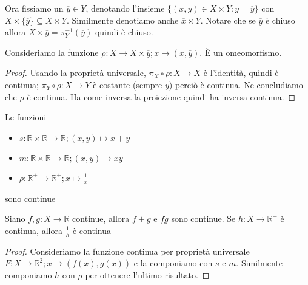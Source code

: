 Ora fissiamo un \(\overline{y} \in Y\), denotando l'insieme \(\{(x, y) \in X
\times Y : y = \overline{y}\} \) con \(X \times \{\overline{y}\}  \subseteq X
\times Y \). Similmente denotiamo anche \(\overline{x} \times Y \). Notare che
se \(\overline{y}\) è chiuso allora \(X \times \overline{y} =
\pi_Y^{-1}(\overline{y})\) quindi è chiuso.
\begin{proposition}
    Consideriamo la funzione \(\rho : X \to X \times \overline{y}; x \mapsto (x,
    \overline{y})\). È un omeomorfismo.
\end{proposition}
\begin{proof}
    Usando la proprietà universale, \(\pi_X \circ \rho : X \to X\) è l'identità,
    quindi è continua; \(\pi_Y \circ \rho : X \to Y\) è costante (sempre
    \(\overline{y}\)) perciò è continua. Ne concludiamo che \(\rho\) è continua.
    Ha come inversa la proiezione quindi ha inversa continua.
\end{proof}

\begin{proposition}
    Le funzioni
\begin{itemize}[label = --]
    \item \(s: \mathbb{R}\times \mathbb{R} \to \mathbb{R}; (x, y) \mapsto x+y\)
    \item \(m: \mathbb{R}\times \mathbb{R} \to \mathbb{R}; (x,y) \mapsto xy\) 
    \item \(\rho: \mathbb{R}^{+} \to \mathbb{R}^{+}; x \mapsto \frac{1}{x}\) 
\end{itemize}
sono continue
\end{proposition}

\begin{proposition}
    Siano \(f, g: X \to \mathbb{R}\) continue, allora \(f+g\) e \(fg\) sono
    continue. Se \(h: X \to \mathbb{R}^{+}\) è continua, allora \(\frac{1}{h}\)
    è continua
\end{proposition}

\begin{proof}
    Consideriamo la funzione continua per proprietà universale \(F: X \to
    \mathbb{R}^2; x \mapsto (f(x),
    g(x))\) e la componiamo con \(s\) e \(m\). Similmente componiamo \(h\) con
    \(\rho\) per ottenere l'ultimo risultato.
\end{proof}

